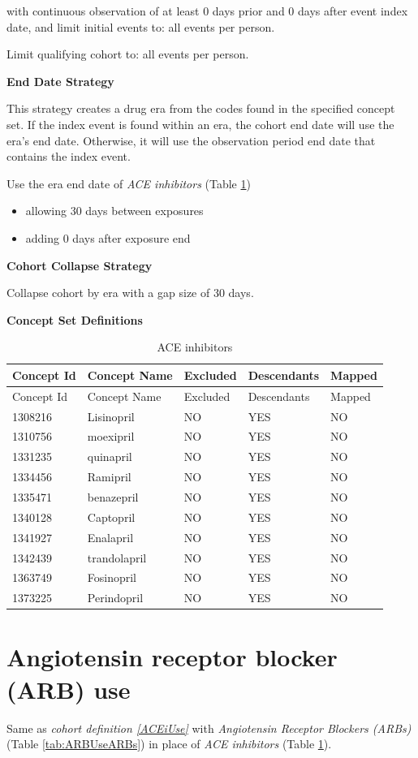 \documentclass[11pt]{book}
\providecommand{\tightlist}{%
  \setlength{\itemsep}{0pt}\setlength{\parskip}{0pt}}
\theoremstyle{definition}
\theoremstyle{definition}
\theoremstyle{definition}
\theoremstyle{remark}
\begin{document}
with continuous observation of at least 0 days prior and 0 days after event index date, and limit initial events to: all events per person.

Limit qualifying cohort to: all events per person.

\textbf{End Date Strategy}

This strategy creates a drug era from the codes found in the specified concept set. If the index event is found within an era, the cohort end date will use the era's end date. Otherwise, it will use the observation period end date that contains the index event.

Use the era end date of \emph{ACE inhibitors} (Table \ref{tab:ACEiUseACE})

\begin{itemize}
\tightlist
\item
  allowing 30 days between exposures
\item
  adding 0 days after exposure end
\end{itemize}

\textbf{Cohort Collapse Strategy}

Collapse cohort by era with a gap size of 30 days.

\textbf{Concept Set Definitions}

\begin{longtable}[]{@{}lllll@{}}
\caption{\label{tab:ACEiUseACE} ACE inhibitors}\tabularnewline
\toprule
Concept Id & Concept Name & Excluded & Descendants & Mapped\tabularnewline
\midrule
\endfirsthead
\toprule
Concept Id & Concept Name & Excluded & Descendants & Mapped\tabularnewline
\midrule
\endhead
1308216 & Lisinopril & NO & YES & NO\tabularnewline
1310756 & moexipril & NO & YES & NO\tabularnewline
1331235 & quinapril & NO & YES & NO\tabularnewline
1334456 & Ramipril & NO & YES & NO\tabularnewline
1335471 & benazepril & NO & YES & NO\tabularnewline
1340128 & Captopril & NO & YES & NO\tabularnewline
1341927 & Enalapril & NO & YES & NO\tabularnewline
1342439 & trandolapril & NO & YES & NO\tabularnewline
1363749 & Fosinopril & NO & YES & NO\tabularnewline
1373225 & Perindopril & NO & YES & NO\tabularnewline
\bottomrule
\end{longtable}

\hypertarget{ARBUse}{%
\section{Angiotensin receptor blocker (ARB) use}\label{ARBUse}}

Same as \emph{cohort definition \ref{ACEiUse}} with \emph{Angiotensin Receptor Blockers (ARBs)} (Table \ref{tab:ARBUseARBs}) in place of \emph{ACE inhibitors} (Table \ref{tab:ACEiUseACE}).
\end{document}
